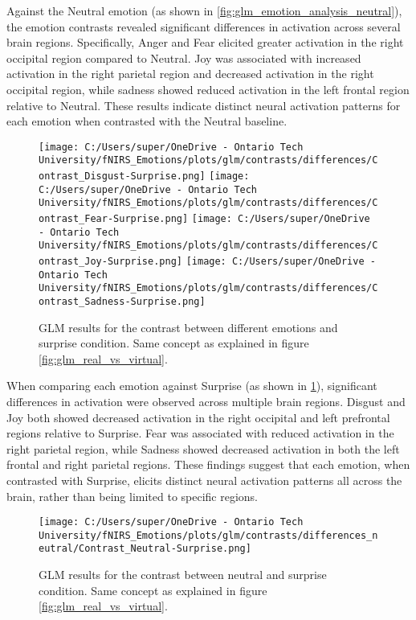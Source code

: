 Against the Neutral emotion (as shown in \ref{fig:glm_emotion_analysis_neutral}), the emotion contrasts revealed significant differences in activation across several brain regions. 
Specifically, Anger and Fear elicited greater activation in the right occipital region compared to Neutral. 
Joy was associated with increased activation in the right parietal region and decreased activation in the right occipital region, while sadness showed reduced activation in the left frontal region relative to Neutral. 
These results indicate distinct neural activation patterns for each emotion when contrasted with the Neutral baseline.

\begin{figure}[H]
    \centering
      \texttt{[image: C:/Users/super/OneDrive - Ontario Tech University/fNIRS\_Emotions/plots/glm/contrasts/differences/Contrast\_Disgust-Surprise.png]}
      \texttt{[image: C:/Users/super/OneDrive - Ontario Tech University/fNIRS\_Emotions/plots/glm/contrasts/differences/Contrast\_Fear-Surprise.png]}
      \texttt{[image: C:/Users/super/OneDrive - Ontario Tech University/fNIRS\_Emotions/plots/glm/contrasts/differences/Contrast\_Joy-Surprise.png]}
      \texttt{[image: C:/Users/super/OneDrive - Ontario Tech University/fNIRS\_Emotions/plots/glm/contrasts/differences/Contrast\_Sadness-Surprise.png]}
      \caption[GLM: Emotion vs. Surprise]{GLM results for the contrast between different emotions and surprise condition.
      Same concept as explained in figure \ref{fig:glm_real_vs_virtual}. }
      \label{fig:glm_emotion_analysis_surprise}
\end{figure}

When comparing each emotion against Surprise (as shown in \ref{fig:glm_emotion_analysis_surprise}), significant differences in activation were observed across multiple brain regions. 
Disgust and Joy both showed decreased activation in the right occipital and left prefrontal regions relative to Surprise. 
Fear was associated with reduced activation in the right parietal region, while Sadness showed decreased activation in both the left frontal and right parietal regions. 
These findings suggest that each emotion, when contrasted with Surprise, elicits distinct neural activation patterns all across the brain, rather than being limited to specific regions.

\begin{figure}[H]
    \centering
      \texttt{[image: C:/Users/super/OneDrive - Ontario Tech University/fNIRS\_Emotions/plots/glm/contrasts/differences\_neutral/Contrast\_Neutral-Surprise.png]}
      \caption[GLM: Neutral vs. Surprise]{GLM results for the contrast between neutral and surprise condition.
      Same concept as explained in figure \ref{fig:glm_real_vs_virtual}. }
      \label{fig:glm_neutral_vs_surprise}
\end{figure}

